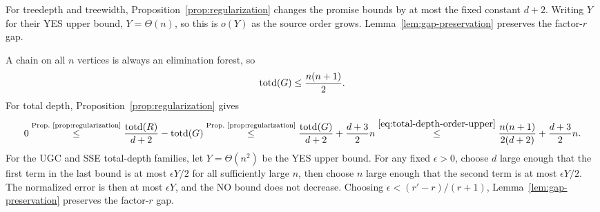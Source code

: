 For treedepth and treewidth, Proposition~\ref{prop:regularization}
changes the promise bounds by at most the fixed constant $d+2$.
Writing $Y$ for their YES upper bound, $Y=\Theta(n)$, so this is $o(Y)$ as the source
order grows. Lemma~\ref{lem:gap-preservation} preserves the
factor-$r$ gap.

A chain on all $n$ vertices is always an elimination forest, so
\begin{equation}\label{eq:total-depth-order-upper}
 \operatorname{totd}(G)\le\frac{n(n+1)}2.
\end{equation}
For total depth, Proposition~\ref{prop:regularization} gives
\begin{equation}\label{eq:regularization-normalized-error}
0\overset{\text{Prop.~\ref{prop:regularization}}}{\le}
 \frac{\operatorname{totd}(R)}{d+2}-\operatorname{totd}(G)
 \overset{\text{Prop.~\ref{prop:regularization}}}{\le}
 \frac{\operatorname{totd}(G)}{d+2}+\frac{d+3}{2}n \overset{\eqref{eq:total-depth-order-upper}}{\le}
 \frac{n(n+1)}{2(d+2)}+\frac{d+3}{2}n.
\end{equation}
For the UGC and SSE total-depth families, let $Y=\Theta(n^2)$ be
the YES upper bound. For any fixed
$\epsilon>0$, choose $d$ large enough that the first term in the
last bound is at most $\epsilon Y/2$ for all sufficiently large $n$,
then choose $n$ large enough that the second term is at most
$\epsilon Y/2$. The normalized error is then at most $\epsilon Y$,
and the NO bound does not decrease. Choosing
$\epsilon<(r'-r)/(r+1)$, Lemma~\ref{lem:gap-preservation}
preserves the factor-$r$ gap.

